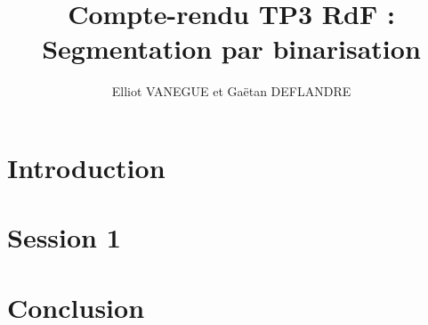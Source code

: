 \documentclass[11pt]{article}
\title{Compte-rendu TP3 RdF : Segmentation par binarisation}
\author{Elliot VANEGUE et Gaëtan DEFLANDRE}
\begin{document}


  \maketitle
  
  \mbox{}
  \newpage
  \clearpage
  
  \section{Introduction}

  
  \section{Session 1}
  
    
  \section{Conclusion}
\end{document}
